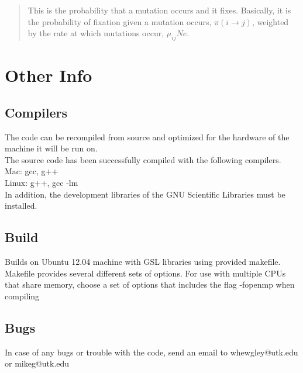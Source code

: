 \documentclass{article}
\begin{document}
	\begin{quote}
		This is the probability that a mutation occurs and it fixes. Basically, it is the probability
		of fixation given a mutation occurs, $\pi(i \rightarrow j)$, weighted by the rate at which mutations
		occur, $\mu_{ij} Ne$. \\
	\end{quote} 


\section{Other Info}
	
	\subsection{Compilers}
		The code can be recompiled from source and optimized for the hardware of the 
		machine it will be run on.\\	
		The source code has been successfully compiled with the following compilers.\\
		Mac:		gcc, g++\\
		Linux:		g++, gcc -lm\\	
		In addition, the development libraries of the GNU Scientific Libraries must be installed.\\
		
	\subsection{Build}
		Builds on Ubuntu 12.04 machine with GSL libraries using provided makefile.\\		
		Makefile provides several different sets of options. For use with multiple CPUs that share memory,
		choose a set of options that includes the flag -fopenmp when compiling\\
	
	\subsection{Bugs}
		In case of any bugs or trouble with the code, send an email to whewgley@utk.edu or mikeg@utk.edu\\
		
\end{document}
